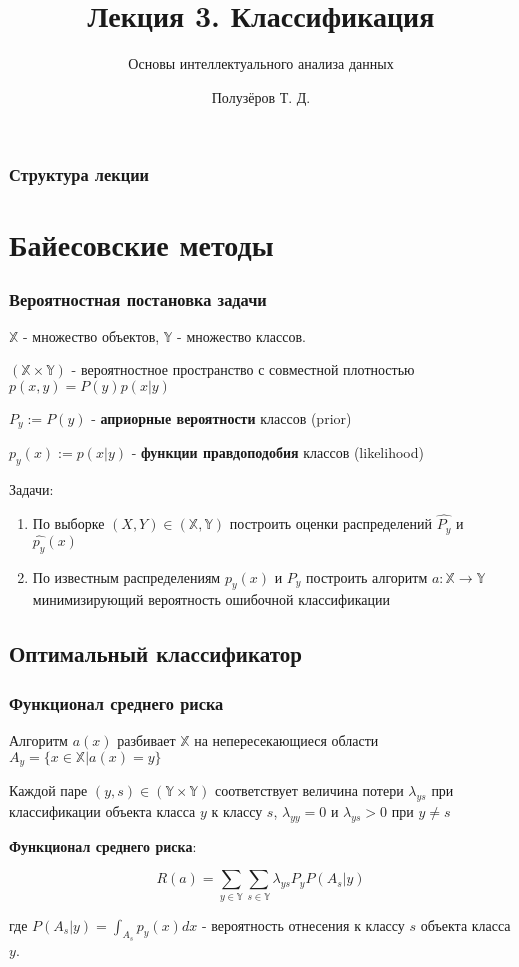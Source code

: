 \documentclass{beamer}
\title[Классификация]{Лекция 3. Классификация}
\subtitle{Основы интеллектуального анализа данных}
\author{Полузёров Т. Д.}
\institute{БГУ ФПМИ}
\date{}
\begin{document}
	
	\begin{frame}
		\titlepage
	\end{frame}
	
	\begin{center}
		\frametitle{Структура лекции}
		\tableofcontents	
	\end{center}
	
	\section{Байесовские методы}
	
	\begin{frame}
		\frametitle{Вероятностная постановка задачи}
		 $\mathbb{X}$ - множество объектов, $\mathbb{Y}$ - множество классов.
		 
		$(\mathbb{X} \times \mathbb{Y})$ - вероятностное пространство с совместной плотностью $p(x, y) = P(y) p(x | y)$
		 
		$P_y := P(y)$ - \textbf{априорные вероятности} классов (prior)
		
		$p_y(x) := p(x | y)$ - \textbf{функции правдоподобия} классов (likelihood)
		
		\vspace{15pt}
		
		Задачи:
		
		\begin{enumerate}
			\item По выборке $(X, Y) \in (\mathbb{X}, \mathbb{Y})$ построить оценки распределений $\hat{P_y}$ и $\hat{p_y}(x)$
			\item По известным распределениям $p_y(x)$ и $P_y$ построить алгоритм $a: \mathbb{X} \rightarrow \mathbb{Y}$ минимизирующий вероятность ошибочной классификации
		\end{enumerate}
	\end{frame}
	
	\subsection{Оптимальный классификатор}
	
	\begin{frame}
		\frametitle{Функционал среднего риска}
		Алгоритм $a(x)$ разбивает $\mathbb{X}$ на непересекающиеся области $A_y = \{x \in \mathbb{X} | a(x) = y \}$
		
		\vspace{10pt}
		
		Каждой паре $(y, s) \in (\mathbb{Y} \times \mathbb{Y})$ соответствует величина потери $\lambda_{ys}$ при классификации объекта класса $y$ к классу $s$, $\lambda_{yy} = 0$ и $\lambda_{ys} > 0$ при $y \ne s$
		
		\vspace{10pt}
		
		\textbf{Функционал среднего риска}:
		
		 \[
		 R(a) = \sum_{y \in \mathbb{Y}} \sum_{s \in \mathbb{Y}}
		 \lambda_{ys} P_y P(A_s | y)
		 \]
		 
		 где $P(A_s | y) = \int_{A_s} p_y(x) dx$ - вероятность отнесения к классу $s$ объекта класса $y$.	 
	\end{frame}
	
\end{document}
